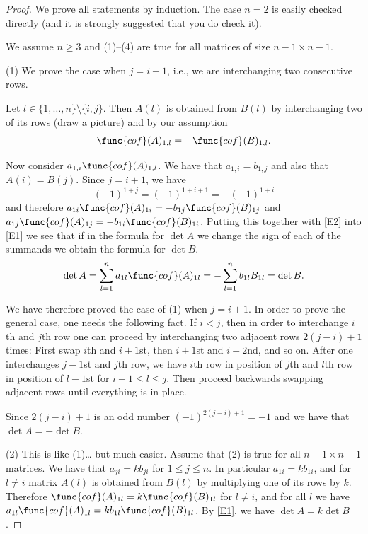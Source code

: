 \begin{proof} 
We prove all statements by induction. The case $n=2$ is easily checked directly (and it is strongly suggested that you do check it). 

We assume $n\geq 3$ and  (1)--(4) are true for all matrices of size $n-1\times n-1$. 

(1) 
We prove the case when $j=i+1$, i.e., we are interchanging two consecutive rows. 

Let $l\in \{1, \dots, n\}\setminus \{i,j\}$. 
Then $A(l)$ is obtained from $B(l)$ by interchanging two of its rows (draw a picture) and 
by our assumption 
\begin{equation} 
\label{E2} 
\func{cof}(A)_{1,l}=-\func{cof}(B)_{1,l}. 
\end{equation} 

Now consider $a_{1,i} \func{cof}(A)_{1,l}$. We have that $a_{1,i}=b_{1,j}$ 
and also that $A(i)=B(j)$. Since $j=i+1$, we have 
\[
(-1)^{1+j}=(-1)^{1+i+1}=-(-1)^{1+i} 
\]
and therefore $a_{1i}\func{cof}(A)_{1i}=-b_{1j} \func{cof}(B)_{1j}$ and $a_{1j}\func{cof}(A)_{1j}=-b_{1i} \func{cof}(B)_{1i}$. 
Putting this together with \eqref{E2} into \eqref{E1} we see that if in the formula
for $\det A$ we change the sign of each of the summands we obtain the formula for $\det B$. 
\[
\det A=\sum_{l=1}^n a_{1l}\func{cof}(A)_{1l}
=-\sum_{l=1}^n b_{1l} B_{1l}
=\det B. 
\]

We have therefore proved the case of (1) when $j=i+1$. In order to prove the general case, 
one needs the following fact. If $i<j$, then in order to interchange $i$th and $j$th row one 
can proceed by interchanging two adjacent rows $2(j-i)+1$ times: 
First swap $i$th and $i+1$st, then $i+1$st and $i+2$nd, and so on. 
After one interchanges $j-1$st and $j$th row, we have $i$th row in position of $j$th
and $l$th row in position of $l-1$st for $i+1\leq l\leq j$. Then proceed backwards 
swapping adjacent 
rows until everything is in place. 

Since $2(j-i)+1$ is an odd number $(-1)^{2(j-i)+1}=-1$ and 
we have that $\det A=-\det B$. 

(2) This is like (1)\dots{} but much easier. 
Assume that (2) is true for all $n-1\times n-1$ matrices. 
We have that $a_{ji}=k b_{ji}$ for $1\leq j\leq n$. 
In particular $a_{1i}=kb_{1i}$, and for $l\neq i$ matrix 
$A(l)$ is obtained from $B(l)$ by multiplying one of its rows by $k$. 
Therefore $\func{cof}(A)_{1l}=k\func{cof}(B)_{1l}$ for $l\neq i$, 
and for all $l$ we have $a_{1l} \func{cof}(A)_{1l}=k b_{1l}\func{cof}(B)_{1l}$. 
By \eqref{E1}, we have $\det A=k\det B$. 


\end{proof}
